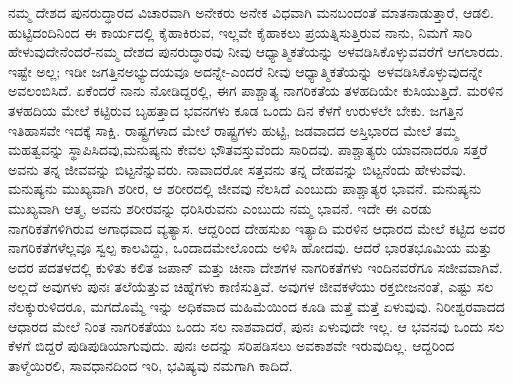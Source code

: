 ನಮ್ಮ ದೇಶದ ಪುನರುದ್ಧಾರದ ವಿಚಾರವಾಗಿ ಅನೇಕರು ಅನೇಕ ವಿಧವಾಗಿ ಮನಬಂದಂತೆ ಮಾತನಾಡುತ್ತಾರೆ, ಆಡಲಿ. ಹುಟ್ಟಿದಂದಿನಿಂದ ಈ ಕಾರ್ಯದಲ್ಲಿ ಕೈಹಾಕಿರುವ, ಇಲ್ಲವೇ ಕೈಹಾಕಲು ಪ್ರಯತ್ನಿಸುತ್ತಿರುವ ನಾನು, ನಿಮಗೆ ಸಾರಿ ಹೇಳುವುದೇನೆಂದರೆ-ನಮ್ಮ ದೇಶದ ಪುನರುದ್ಧಾರವು ನೀವು ಆಧ್ಯಾತ್ಮಿಕತೆಯನ್ನು ಅಳವಡಿಸಿಕೊಳ್ಳುವವರೆಗೆ ಆಗಲಾರದು. ಇಷ್ಟೇ ಅಲ್ಲ; ಇಡೀ ಜಗತ್ತಿನ\break ಅಭ್ಯುದಯವೂ ಅದನ್ನೇ-ಎಂದರೆ ನೀವು ಆಧ್ಯಾತ್ಮಿಕತೆಯನ್ನು ಅಳವಡಿಸಿ\break ಕೊಳ್ಳುವುದನ್ನೇ ಅವಲಂಬಿಸಿದೆ. ಏಕೆಂದರೆ ನಾನು ನೋಡಿದ್ದರಲ್ಲಿ, ಈಗ ಪಾಶ್ಚಾತ್ಯ ನಾಗರಿಕತೆಯ ತಳಹದಿಯೇ ಕುಸಿಯುತ್ತಿದೆ. ಮರಳಿನ ತಳಹದಿಯ ಮೇಲೆ ಕಟ್ಟಿರುವ ಬೃಹತ್ತಾದ ಭವನಗಳು ಕೂಡ ಒಂದು ದಿನ ಕೆಳಗೆ ಉರುಳಲೇ ಬೇಕು. ಜಗತ್ತಿನ ಇತಿಹಾಸವೇ ಇದಕ್ಕೆ ಸಾಕ್ಷಿ. ರಾಷ್ಟ್ರಗಳಾದ ಮೇಲೆ ರಾಷ್ಟ್ರಗಳು ಹುಟ್ಟಿ, ಜಡವಾದದ ಅಸ್ತಿಭಾರದ ಮೇಲೆ ತಮ್ಮ ಮಹತ್ವವನ್ನು ಸ್ಥಾಪಿಸಿದವು,\break ಮನುಷ್ಯನು ಕೇವಲ ಭೌತವಸ್ತುವೆಂದು ಸಾರಿದವು. ಪಾಶ್ಚಾತ್ಯರು ಯಾವ\-ನಾದರೂ ಸತ್ತರೆ ಅವನು ತನ್ನ ಜೀವವನ್ನು ಬಿಟ್ಟನೆನ್ನುವರು. ನಾವಾದರೋ ಸತ್ತವನು ತನ್ನ ದೇಹವನ್ನು ಬಿಟ್ಟನೆಂದು ಹೇಳುವೆವು. ಮನುಷ್ಯನು ಮುಖ್ಯವಾಗಿ ಶರೀರ, ಆ ಶರೀರದಲ್ಲಿ ಜೀವವು ನೆಲಸಿದೆ ಎಂಬುದು ಪಾಶ್ಚಾತ್ಯರ ಭಾವನೆ. ಮನುಷ್ಯನು ಮುಖ್ಯವಾಗಿ ಆತ್ಮ, ಅವನು ಶರೀರವನ್ನು ಧರಿಸಿರುವನು ಎಂಬುದು ನಮ್ಮ ಭಾವನೆ. ಇದೇ ಈ ಎರಡು ನಾಗರಿಕತೆಗಳಿಗಿರುವ ಅಗಾಧವಾದ ವ್ಯತ್ಯಾಸ. ಆದ್ದರಿಂದ ದೇಹಸುಖ ಇತ್ಯಾದಿ ಮರಳಿನ ಆಧಾರದ ಮೇಲೆ ಕಟ್ಟಿದ ಅವರ ನಾಗರಿಕತೆಗಳೆಲ್ಲವೂ ಸ್ವಲ್ಪ ಕಾಲವಿದ್ದು, ಒಂದಾದಮೇಲೊಂದು ಅಳಿಸಿ ಹೋದವು. ಆದರೆ ಭಾರತಭೂಮಿಯ ಮತ್ತು ಅದರ ಪದತಳದಲ್ಲಿ ಕುಳಿತು ಕಲಿತ ಜಪಾನ್​ ಮತ್ತು ಚೀನಾ ದೇಶಗಳ ನಾಗರಿಕತೆಗಳು ಇಂದಿನವರೆಗೂ ಸಜೀವವಾಗಿವೆ. ಅಲ್ಲದೆ ಅವುಗಳು ಪುನಃ ತಲೆಯೆತ್ತುವ ಚಿಹ್ನೆಗಳು ಕಾಣಿಸುತ್ತಿವೆ. ಅವುಗಳ ಜೀವಕಳೆಯು ರಕ್ತಬೀಜನಂತೆ, ಎಷ್ಟು ಸಲ ನೆಲಕ್ಕುರುಳಿದರೂ, ಮಗದೊಮ್ಮೆ ಇನ್ನು ಅಧಿಕವಾದ ಮಹಿಮೆಯಿಂದ ಕೂಡಿ ಮತ್ತೆ ಮತ್ತೆ ಏಳುವುವು. ನಿರೀಶ್ವರವಾದದ ಆಧಾರದ ಮೇಲೆ ನಿಂತ ನಾಗರಿಕತೆಯು ಒಂದು ಸಲ ನಾಶವಾದರೆ, ಪುನಃ ಏಳುವುದೇ ಇಲ್ಲ. ಆ ಭವನವು ಒಂದು ಸಲ ಕೆಳಗೆ ಬಿದ್ದರೆ ಪುಡಿಪುಡಿಯಾಗುವುದು. ಪುನಃ ಅದನ್ನು ಸರಿಪಡಿಸಲು ಅವಕಾಶವೇ ಇರುವು\-ದಿಲ್ಲ. ಆದ್ದರಿಂದ ತಾಳ್ಮೆಯಿರಲಿ, ಸಾವಧಾನದಿಂದ ಇರಿ, ಭವಿಷ್ಯವು ನಮಗಾಗಿ ಕಾದಿದೆ.


